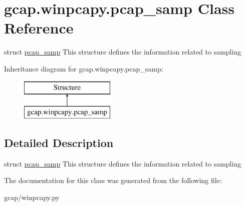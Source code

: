 \hypertarget{classgcap_1_1winpcapy_1_1pcap__samp}{}\section{gcap.\+winpcapy.\+pcap\+\_\+samp Class Reference}
\label{classgcap_1_1winpcapy_1_1pcap__samp}


struct \hyperlink{classgcap_1_1winpcapy_1_1pcap__samp}{pcap\+\_\+samp} This structure defines the information related to sampling  


Inheritance diagram for gcap.\+winpcapy.\+pcap\+\_\+samp\+:\begin{figure}[H]
\begin{center}
\leavevmode
\includegraphics[height=2.000000cm]{d4/d4b/classgcap_1_1winpcapy_1_1pcap__samp}
\end{center}
\end{figure}


\subsection{Detailed Description}
struct \hyperlink{classgcap_1_1winpcapy_1_1pcap__samp}{pcap\+\_\+samp} This structure defines the information related to sampling 

The documentation for this class was generated from the following file\+:\begin{DoxyCompactItemize}
\item 
gcap/winpcapy.\+py\end{DoxyCompactItemize}
